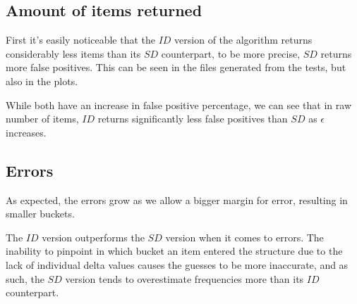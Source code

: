 \documentclass[...]{revdetua}
\begin{document}
\subsection{Amount of items returned}
First it's easily noticeable that the $ID$ version of the algorithm returns considerably less items than its $SD$ counterpart, to be more precise, $SD$ returns more false positives.
This can be seen in the files generated from the tests, but also in the plots. \par
While both have an increase in false positive percentage, we can see that in raw number of items, $ID$ returns significantly less false positives than $SD$ as $\epsilon$ increases.
\subsection{Errors}
As expected, the errors grow as we allow a bigger margin for error, resulting in smaller buckets.\par
The $ID$ version outperforms the $SD$ version when it comes to errors.
The inability to pinpoint in which bucket an item  entered the structure due to the lack of individual delta values causes the guesses to be more inaccurate, and as such, the $SD$ version tends to overestimate frequencies more than its $ID$ counterpart.
\end{document}
